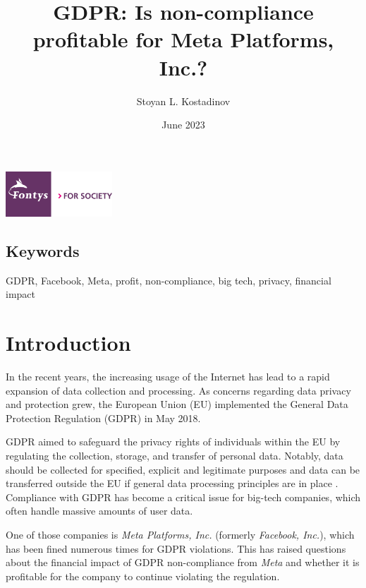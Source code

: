 \documentclass[12pt, a4paper]{article}
\title{GDPR: Is non-compliance profitable for Meta Platforms, Inc.?}
\author{Stoyan L. Kostadinov}
\date{June 2023}
\begin{document}
\maketitle

\begin{center}
    \includegraphics[width=0.3\textwidth]{fontys-logo}
\end{center}

\begin{abstract}
\end{abstract}

\subsection*{Keywords}

GDPR, Facebook, Meta, profit, non-compliance, big tech, privacy, financial
impact

\section*{Introduction}

In the recent years, the increasing usage of the Internet has lead to a rapid
expansion of data collection and processing\cite{khan2014big}. As concerns
regarding data privacy and protection grew, the European Union (EU) implemented
the General Data Protection Regulation (GDPR) in May
2018\cite{greengard2018weighing, historyGdpr}.

GDPR aimed to safeguard the privacy rights of individuals within the EU by
regulating the collection, storage, and transfer of personal
data\cite{historyGdpr}. Notably, data should be collected for specified,
explicit and legitimate purposes\cite{europeanParliamentGdprArticle5} and data
can be transferred outside the EU if general data processing principles are in
place \cite{europeanParliamentGdprArticle44}. Compliance with GDPR has become a
critical issue for big-tech companies, which often handle massive amounts of
user data.

One of those companies is \textit{Meta Platforms, Inc.} (formerly
\textit{Facebook, Inc.}), which has been fined numerous times for GDPR
violations\cite{mrevzar2023analysis}. This has raised questions about the
financial impact of GDPR non-compliance from \textit{Meta} and whether it is
profitable for the company to continue violating the regulation.
\end{document}
